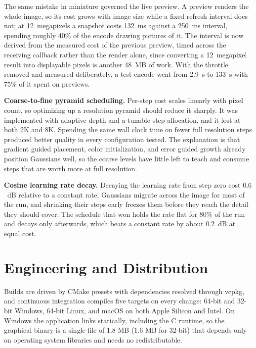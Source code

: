 \documentclass[11pt,a4paper]{article}
\begin{document}
The same mistake in miniature governed the live preview. A preview renders the whole image, so its cost grows with image size while a fixed refresh interval does not; at 12~megapixels a snapshot costs 132~ms against a 250~ms interval, spending roughly 40\% of the encode drawing pictures of it. The interval is now derived from the measured cost of the previous preview, timed across the receiving callback rather than the render alone, since converting a 12~megapixel result into displayable pixels is another 48~MB of work. With the throttle removed and measured deliberately, a test encode went from 2.9~s to 133~s with 75\% of it spent on previews.

\textbf{Coarse-to-fine pyramid scheduling.} Per-step cost scales linearly with pixel count, so optimizing up a resolution pyramid should reduce it sharply. It was implemented with adaptive depth and a tunable step allocation, and it lost at both 2K and 8K. Spending the same wall clock time on fewer full resolution steps produced better quality in every configuration tested. The explanation is that gradient guided placement, color initialization, and error guided growth already position Gaussians well, so the coarse levels have little left to teach and consume steps that are worth more at full resolution.

\textbf{Cosine learning rate decay.} Decaying the learning rate from step zero cost $0.6$~dB relative to a constant rate. Gaussians migrate across the image for most of the run, and shrinking their steps early freezes them before they reach the detail they should cover. The schedule that won holds the rate flat for 80\% of the run and decays only afterwards, which beats a constant rate by about $0.2$~dB at equal cost.

\section{Engineering and Distribution}

Builds are driven by CMake presets with dependencies resolved through vcpkg, and continuous integration compiles five targets on every change: 64-bit and 32-bit Windows, 64-bit Linux, and macOS on both Apple Silicon and Intel. On Windows the application links statically, including the C runtime, so the graphical binary is a single file of 1.8 MB (1.6 MB for 32-bit) that depends only on operating system libraries and needs no redistributable.
\end{document}
